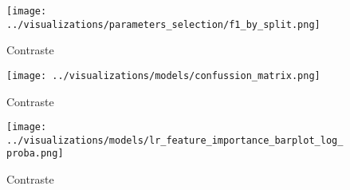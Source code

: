 \begin{figure}[h!]
    \centering
    \texttt{[image: ../visualizations/parameters\_selection/f1\_by\_split.png]}
    \caption{Contraste}
    \label{fig}
\end{figure}

\begin{figure}[h!]
    \centering
    \texttt{[image: ../visualizations/models/confussion\_matrix.png]}
    \caption{Contraste}
    \label{fig}
\end{figure}

\begin{figure}[h!]
    \centering
    \texttt{[image: ../visualizations/models/lr\_feature\_importance\_barplot\_log\_proba.png]}
    \caption{Contraste}
    \label{fig}
\end{figure}